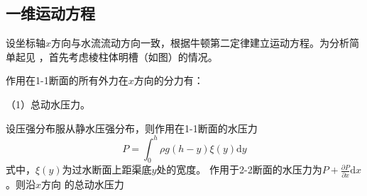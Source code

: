                                                         \subsection{一维运动方程}
                                                        设坐标轴$x$方向与水流流动方向一致，根据牛顿第二定律建立运动方程。为分析简单起见
                                                        ，首先考虑棱柱体明槽（如图）的情况。

                                                        作用在1-1断面的所有外力在$x$方向的分力有：

                                                        （1）总动水压力。

                                                        设压强分布服从静水压强分布，则作用在1-1断面的水压力
                                                        \begin{equation}
                                                          P
                                                          =
                                                          \int_{0}^{h}\! \rho g(h-y)\xi(y)\mathrm{d}y
                                                        \end{equation}
                                                        式中，$\xi(y)$为过水断面上距渠底$y$处的宽度。
                                                        作用于2-2断面的水压力为$P+\frac{\partial P}{\partial x}\mathrm{d}x$。则沿$x$方向
                                                        的总动水压力
